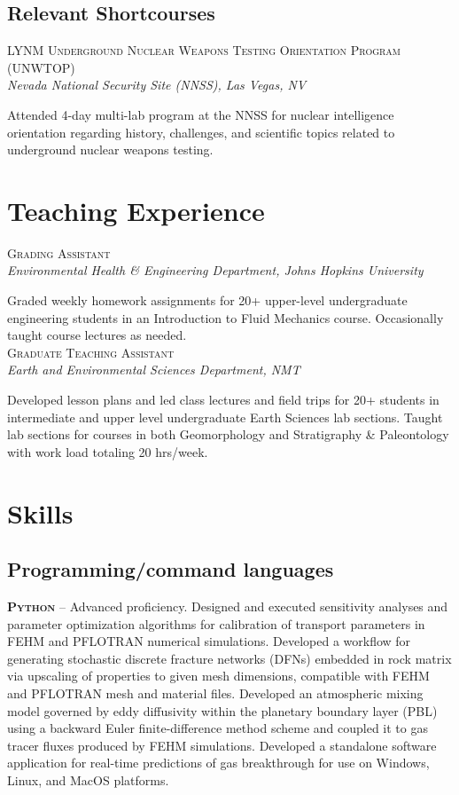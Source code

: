 \documentclass[11pt, letterpaper]{article}
\newcommand{\years}[1]{\marginnote{\scriptsize #1}}
\begin{document}
\subsection*{Relevant Shortcourses}
\label{sec:shortcourses}
\years{2023} \textsc{LYNM Underground Nuclear Weapons Testing Orientation Program (UNWTOP)}\\
\textit{Nevada National Security Site (NNSS), Las Vegas, NV}

    Attended 4-day multi-lab program at the NNSS for nuclear intelligence
    orientation regarding history, challenges, and scientific topics related to
    underground nuclear weapons testing. 


\section*{Teaching Experience}
\noindent
\years{2019}\textsc{Grading Assistant}\\
\textit{Environmental Health \& Engineering Department, Johns Hopkins University}

	Graded weekly homework assignments for 20+ upper-level undergraduate
	engineering students in an Introduction to Fluid Mechanics course.
	Occasionally taught course lectures as needed.\\

\years{2015 - 2016}\textsc{Graduate Teaching Assistant}\\
\textit{Earth and Environmental Sciences Department, NMT}

    Developed lesson plans and led class lectures and field trips for 20+
    students in intermediate and upper level undergraduate Earth Sciences lab
    sections. Taught lab sections for courses in both Geomorphology and Stratigraphy
    \& Paleontology with work load totaling 20 hrs/week.  

\section*{Skills}
\setlength{\parskip}{5pt}
\subsection*{Programming/command languages}
\noindent
\textbf{\textsc{Python}} -- Advanced proficiency. Designed and executed
sensitivity analyses and parameter optimization algorithms for calibration of transport
parameters in FEHM and PFLOTRAN numerical simulations. Developed a workflow for
generating stochastic discrete fracture networks (DFNs) embedded in rock matrix
via upscaling of properties to given mesh dimensions, compatible with FEHM and
PFLOTRAN mesh and material files. Developed an atmospheric mixing model
governed by eddy diffusivity within the planetary boundary layer (PBL) using a
backward Euler finite-difference method scheme and coupled it to gas tracer
fluxes produced by FEHM simulations. Developed a standalone software
application for real-time predictions of gas breakthrough for use on Windows,
Linux, and MacOS platforms.
\end{document}
